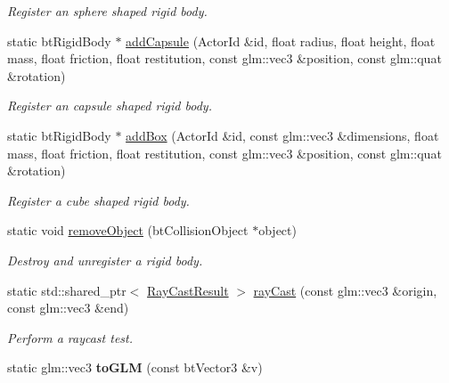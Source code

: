 \begin{DoxyCompactItemize}
\begin{DoxyCompactList}\small\item\em Register an sphere shaped rigid body. \end{DoxyCompactList}\item 
static bt\+Rigid\+Body $\ast$ \hyperlink{classTarbora_1_1PhysicsEngine_a82787c2e79bbf802c6b6acbc828fbad8}{add\+Capsule} (Actor\+Id \&id, float radius, float height, float mass, float friction, float restitution, const glm\+::vec3 \&position, const glm\+::quat \&rotation)
\begin{DoxyCompactList}\small\item\em Register an capsule shaped rigid body. \end{DoxyCompactList}\item 
static bt\+Rigid\+Body $\ast$ \hyperlink{classTarbora_1_1PhysicsEngine_a91b5135f470a3648242224fa34358d71}{add\+Box} (Actor\+Id \&id, const glm\+::vec3 \&dimensions, float mass, float friction, float restitution, const glm\+::vec3 \&position, const glm\+::quat \&rotation)
\begin{DoxyCompactList}\small\item\em Register a cube shaped rigid body. \end{DoxyCompactList}\item 
static void \hyperlink{classTarbora_1_1PhysicsEngine_a107e09ad38a63f9ced3f4fcec7669e2a}{remove\+Object} (bt\+Collision\+Object $\ast$object)
\begin{DoxyCompactList}\small\item\em Destroy and unregister a rigid body. \end{DoxyCompactList}\item 
static std\+::shared\+\_\+ptr$<$ \hyperlink{structTarbora_1_1RayCastResult}{Ray\+Cast\+Result} $>$ \hyperlink{classTarbora_1_1PhysicsEngine_aa8a52fabbe34b050ff53a28313425edd}{ray\+Cast} (const glm\+::vec3 \&origin, const glm\+::vec3 \&end)
\begin{DoxyCompactList}\small\item\em Perform a raycast test. \end{DoxyCompactList}\item 
\mbox{\label{classTarbora_1_1PhysicsEngine_ae2613d9746a42a760f3cd71c1d59c3e6}} 
static glm\+::vec3 {\bfseries to\+G\+LM} (const bt\+Vector3 \&v)
\item 
\mbox{\label{classTarbora_1_1PhysicsEngine_a587267088b97751dc8eb7d1f4683ce0f}} 

\end{DoxyCompactItemize}
